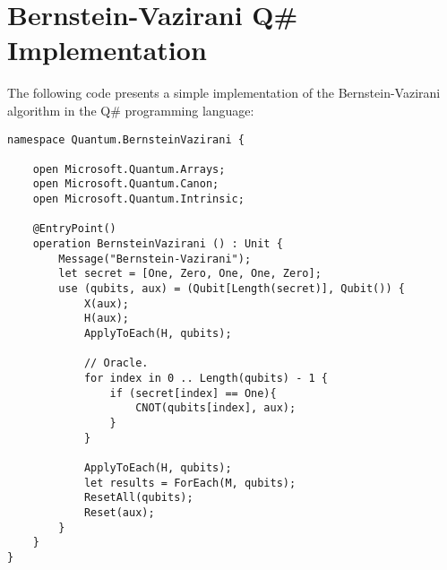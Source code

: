 %
%
\chapter{Bernstein-Vazirani Q\# Implementation}
 
The following code presents a simple implementation of the Bernstein-Vazirani algorithm in the Q\# programming language:

\begin{lstlisting}
namespace Quantum.BernsteinVazirani {

    open Microsoft.Quantum.Arrays;
    open Microsoft.Quantum.Canon;
    open Microsoft.Quantum.Intrinsic;

    @EntryPoint()
    operation BernsteinVazirani () : Unit {
        Message("Bernstein-Vazirani");
        let secret = [One, Zero, One, One, Zero];
        use (qubits, aux) = (Qubit[Length(secret)], Qubit()) {
            X(aux);
            H(aux);
            ApplyToEach(H, qubits);

            // Oracle.
            for index in 0 .. Length(qubits) - 1 {
                if (secret[index] == One){
                    CNOT(qubits[index], aux);
                }
            }

            ApplyToEach(H, qubits);
            let results = ForEach(M, qubits);
            ResetAll(qubits);
            Reset(aux);
        }
    }
}
\end{lstlisting}

